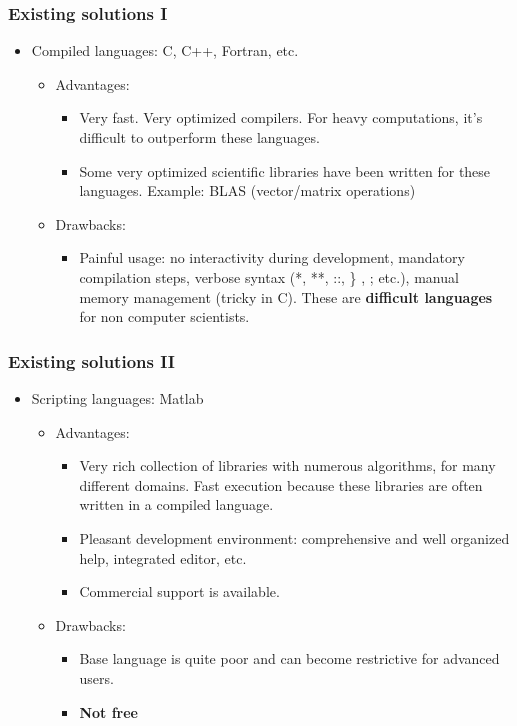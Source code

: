 \documentclass[colorlinks]{beamer}
\begin{document}
\begin{frame}\frametitle{ Existing solutions I}
\begin{itemize}
    \item Compiled languages: C, C++, Fortran, etc.
        \begin{itemize}
            \item Advantages:
                \begin{itemize}
                    \item \tiny Very fast. Very optimized compilers. For heavy computations, it’s difficult to outperform these languages.
                    \item \tiny Some very optimized scientific libraries have been written for these languages. Example: BLAS (vector/matrix operations)
                \end{itemize}
            \item Drawbacks:
                \begin{itemize}
                    \item \tiny Painful usage: no interactivity during development, mandatory compilation steps, verbose syntax (*, **, ::, \} , ; etc.), manual memory management (tricky in C). These are \textbf{difficult languages} for non computer scientists.
                 \end{itemize}
        \end{itemize}
 \end{itemize}

\end{frame}
\begin{frame}\frametitle{ Existing solutions II}
\begin{itemize}
    \item Scripting languages: Matlab   
        \begin{itemize}
            \item Advantages:
                \begin{itemize}
                    \item \tiny Very rich collection of libraries with numerous algorithms, for many different domains. Fast execution because these libraries are often written in a compiled language.
                    \item \tiny Pleasant development environment: comprehensive and well organized help, integrated editor, etc.
                    \item \tiny Commercial support is available. 
                \end{itemize}
            \item Drawbacks:
                \begin{itemize}
                    \item \tiny Base language is quite poor and can become restrictive for advanced users.
                    \item \textbf{Not free }
                \end{itemize}
        \end{itemize}
    \end{itemize}
\end{frame}
\end{document}
